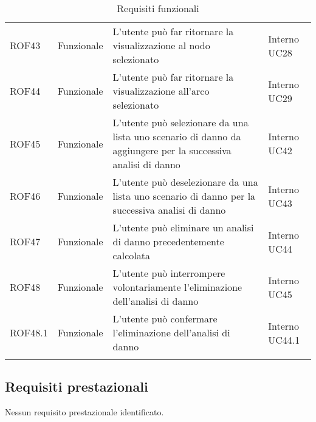 \begin{longtable}{p{2cm}!{\VRule[1pt]}p{2cm}!{\VRule[1pt]}p{5cm}!{\VRule[1pt]}p{1.5cm}}
	\\
	ROF43                            & Funzionale\newline               & L'utente può far ritornare la visualizzazione al nodo selezionato                                                        & Interno \newline UC28        
	\\
	ROF44                            & Funzionale\newline               & L'utente può far ritornare la visualizzazione all'arco selezionato                                                       & Interno \newline UC29        
	\\
	ROF45                            & Funzionale\newline               & L'utente può  selezionare da una lista uno scenario di danno da aggiungere per la successiva analisi di danno            & Interno \newline UC42        
	\\
	ROF46                            & Funzionale\newline               & L'utente può deselezionare da una lista uno scenario di danno per la successiva analisi di danno                         & Interno \newline UC43        
	\\
	ROF47                            & Funzionale\newline               & L'utente può eliminare un analisi di danno precedentemente calcolata                                                     & Interno \newline UC44        
	\\
	ROF48                            & Funzionale\newline               & L'utente può interrompere volontariamente l'eliminazione dell'analisi di danno                                           & Interno \newline UC45        
	\\
	ROF48.1                          & Funzionale\newline               & L'utente può confermare l'eliminazione dell'analisi di danno                                                             & Interno \newline UC44.1      
	\\
	\caption{Requisiti funzionali}
\end{longtable}
\subsection{Requisiti prestazionali}
Nessun requisito prestazionale identificato.
